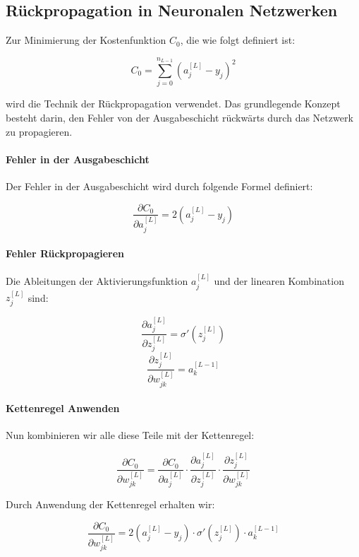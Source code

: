 \subsection{Rückpropagation in Neuronalen Netzwerken}

Zur Minimierung der Kostenfunktion \( C_0 \), die wie folgt definiert ist:

\begin{equation}
C_0 = \sum_{j=0}^{n_{L-1}} (a_j^{[L]} - y_j)^2
\end{equation}

wird die Technik der Rückpropagation verwendet. Das grundlegende Konzept besteht darin, den Fehler von der Ausgabeschicht rückwärts durch das Netzwerk zu propagieren.

\paragraph{Fehler in der Ausgabeschicht}

Der Fehler in der Ausgabeschicht wird durch folgende Formel definiert:

\[
\frac{\partial C_0}{\partial a_j^{[L]}} = 2 \left( a_j^{[L]} - y_j \right)
\]

\paragraph{Fehler Rückpropagieren}

Die Ableitungen der Aktivierungsfunktion \( a_j^{[L]} \) und der linearen Kombination \( z_j^{[L]} \) sind:

\[
\frac{\partial a_j^{[L]}}{\partial z_j^{[L]}} = \sigma' \left( z_j^{[L]} \right)
\]
\[
\frac{\partial z_j^{[L]}}{\partial w_{jk}^{[L]}} = a_k^{[L-1]}
\]

\paragraph{Kettenregel Anwenden}

Nun kombinieren wir alle diese Teile mit der Kettenregel:

\[
\frac{\partial C_0}{\partial w_{jk}^{[L]}} = \frac{\partial C_0}{\partial a_j^{[L]}} \cdot \frac{\partial a_j^{[L]}}{\partial z_j^{[L]}} \cdot \frac{\partial z_j^{[L]}}{\partial w_{jk}^{[L]}}\]

Durch Anwendung der Kettenregel erhalten wir:

\[
\frac{\partial C_0}{\partial w_{jk}^{[L]}} = 2 \left( a_j^{[L]} - y_j \right) \cdot \sigma' \left( z_j^{[L]} \right) \cdot a_k^{[L-1]}
\]


